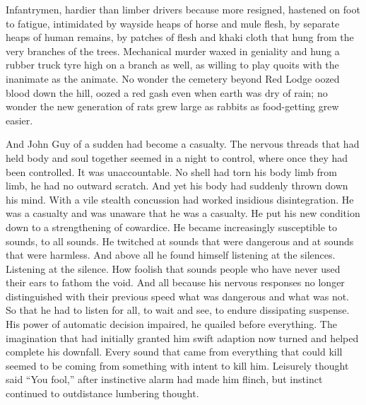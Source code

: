 Infantrymen, hardier than limber drivers because more resigned, hastened on foot to fatigue, intimidated by wayside heaps of horse and mule flesh, by separate heaps of human remains, by patches of flesh and khaki cloth that hung from the very branches of the trees. Mechanical murder waxed in geniality and hung a rubber truck tyre high on a branch as well, as willing to play quoits with the inanimate as the animate. No wonder the cemetery beyond Red Lodge oozed blood down the hill, oozed a red gash even when earth was dry of rain; no wonder the new generation of rats grew large as rabbits as food-getting grew easier.

And John Guy of a sudden had become a casualty. The nervous threads that had held body and soul together seemed in a night to control, where once they had been controlled. It was unaccountable. No shell had torn his body limb from limb, he had no outward scratch. And yet his body had suddenly thrown down his mind. With a vile stealth concussion had worked insidious disintegration. He was a casualty and was unaware that he was a casualty. He put his new condition down to a strengthening of cowardice. He became increasingly susceptible to sounds, to all sounds. He twitched at sounds that were dangerous and at sounds that were harmless. And above all he found himself listening at the silences. Listening at the silence. How foolish that sounds people who have never used their ears to fathom the void. And all because his nervous responses no longer distinguished with their previous speed what was dangerous and what was not. So that he had to listen for all, to wait and see, to endure dissipating suspense. His power of automatic decision impaired, he quailed before everything. The imagination that had initially granted him swift adaption now turned and helped complete his downfall. Every sound that came from everything that could kill seemed to be coming from something with intent to kill him. Leisurely thought said ``You fool,'' after instinctive alarm had made him flinch, but instinct continued to outdistance lumbering thought.

